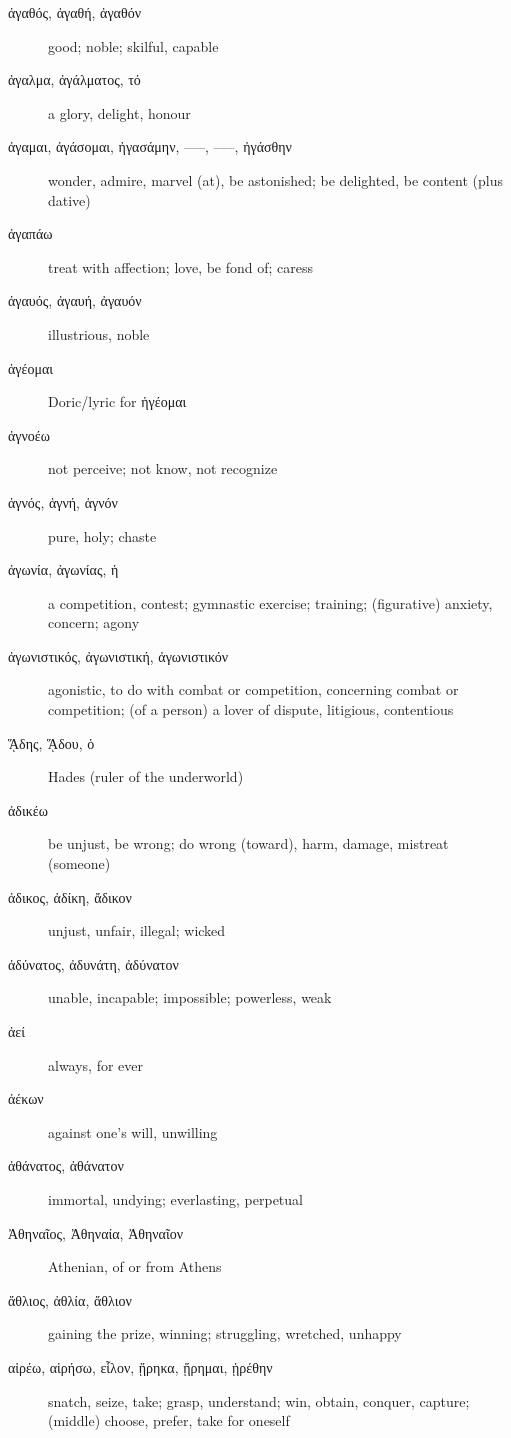 \documentclass[12pt,letterpaper]{article}
\begin{document}
\begin{description}
    \item[\textgreek{ἀγαθός, ἀγαθή, ἀγαθόν}] \marginnote{*}good; noble; skilful, capable
    \item[\textgreek{ἀγαλμα, ἀγάλματος, τό}] a glory, delight, honour
    \item[\textgreek{ἀγαμαι, ἀγάσομαι, ἠγασάμην, –––, –––, ἠγάσθην}] wonder, admire, marvel (at), be astonished; be delighted, be content (plus dative)
    \item[\textgreek{ἀγαπάω}] treat with affection; love, be fond of; caress
    \item[\textgreek{ἀγαυός, ἀγαυή, ἀγαυόν}] illustrious, noble
    \item[\textgreek{ἁγέομαι}] Doric/lyric for \textgreek{ἡγέομαι}
    \item[\textgreek{ἀγνοέω}] not perceive; not know, not recognize
    \item[\textgreek{ἁγνός, ἁγνή, ἁγνόν}] pure, holy; chaste
    \item[\textgreek{ἀγωνία, ἀγωνίας, ἡ}] a competition, contest; gymnastic exercise; training; (figurative) anxiety, concern; agony
    \item[\textgreek{ἀγωνιστικός, ἀγωνιστική, ἀγωνιστικόν}] agonistic, to do with combat or competition, concerning combat or competition; (of a person) a lover of dispute, litigious, contentious
    \item[\textgreek{ᾍδης, ᾍδου, ὁ}] Hades (ruler of the underworld)
    \item[\textgreek{ἀδικέω}] \marginnote{*}be unjust, be wrong; do wrong (toward), harm, damage, mistreat (someone)
    \item[\textgreek{ἀδικος, ἀδίκη, ἄδικον}] unjust, unfair, illegal; wicked
    \item[\textgreek{ἀδύνατος, ἀδυνάτη, ἀδύνατον}] \marginnote{*}unable, incapable; impossible; powerless, weak
    \item[\textgreek{ἀεί}] \marginnote{*}always, for ever
    \item[\textgreek{ἀέκων}] against one's will, unwilling
    \item[\textgreek{ἀθάνατος, ἀθάνατον}] immortal, undying; everlasting, perpetual
    \item[\textgreek{Ἀθηναῖος, Ἀθηναία, Ἀθηναῖον}] Athenian, of or from Athens
    \item[\textgreek{ἄθλιος, ἀθλία, ἄθλιον}] gaining the prize, winning; struggling, wretched, unhappy
    \item[\textgreek{αἱρέω, αἱρήσω, εἷλον, ᾕρηκα, ᾕρημαι, ᾑρέθην}] \marginnote{*}snatch, seize, take; grasp, understand; win, obtain, conquer, capture; (middle) choose, prefer, take for oneself

\end{description}
\end{document}

